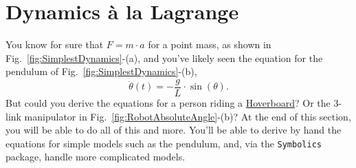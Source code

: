 \section{Dynamics \`a la Lagrange}
\label{sec:LagrangianDynamics}

You know for sure that $F = m \cdot a$ for a point mass, as shown in Fig.~\ref{fig:SimplestDynamics}-(a), and you've likely seen the equation for the pendulum of Fig.~\ref{fig:SimplestDynamics}-(b),
\begin{equation}
\label{eq:IdealPendulum}
  \ddot{\theta}(t) = - \frac{g}{L} \cdot \sin(\theta).  
\end{equation}
But could you derive the equations for a person riding a \href{https://youtu.be/nA6vofrLypg}{Hoverboard}? Or the 3-link manipulator in Fig.~\ref{fig:RobotAbsoluteAngle}-(b)? At the end of this section, you will be able to do all of this and more. You'll be able to derive by hand the equations for simple models such as the pendulum, and, via the \texttt{Symbolics} package, handle more complicated models. 

\bigskip

